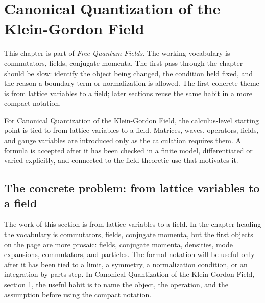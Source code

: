 \chapter{Canonical Quantization of the Klein-Gordon Field}


This chapter is part of \emph{Free Quantum Fields}.  The working vocabulary is commutators, fields, conjugate momenta.  The first pass through the chapter should be slow: identify the object being changed, the condition held fixed, and the reason a boundary term or normalization is allowed.  The first concrete theme is from lattice variables to a field; later sections reuse the same habit in a more compact notation.

For Canonical Quantization of the Klein-Gordon Field, the calculus-level starting point is tied to from lattice variables to a field.  Matrices, waves, operators, fields, and gauge variables are introduced only as the calculation requires them.  A formula is accepted after it has been checked in a finite model, differentiated or varied explicitly, and connected to the field-theoretic use that motivates it.

\section{The concrete problem: from lattice variables to a field}













The work of this section is from lattice variables to a field.  In the chapter heading the vocabulary is commutators, fields, conjugate momenta, but the first objects on the page are more prosaic: fields, conjugate momenta, densities, mode expansions, commutators, and particles.  The formal notation will be useful only after it has been tied to a limit, a symmetry, a normalization condition, or an integration-by-parts step.  In Canonical Quantization of the Klein-Gordon Field, section 1, the useful habit is to name the object, the operation, and the assumption before using the compact notation.

